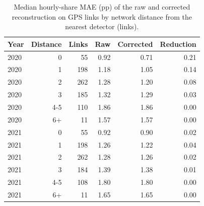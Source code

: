 \begin{table}[htbp]\centering
\caption{Median hourly-share MAE (pp) of the raw and corrected reconstruction on GPS links by network distance from the nearest detector (links).}
\label{tab:distance}
\begin{tabular}{@{}lrrrrr@{}}\toprule
Year & Distance & Links & Raw & Corrected & Reduction \\\midrule
2020 & 0 & 55 & 0.92 & 0.71 & 0.21 \\
2020 & 1 & 198 & 1.18 & 1.05 & 0.14 \\
2020 & 2 & 262 & 1.28 & 1.20 & 0.08 \\
2020 & 3 & 185 & 1.32 & 1.29 & 0.03 \\
2020 & 4-5 & 110 & 1.86 & 1.86 & 0.00 \\
2020 & 6+ & 11 & 1.57 & 1.57 & 0.00 \\
2021 & 0 & 55 & 0.92 & 0.90 & 0.02 \\
2021 & 1 & 198 & 1.26 & 1.22 & 0.04 \\
2021 & 2 & 262 & 1.28 & 1.26 & 0.02 \\
2021 & 3 & 184 & 1.39 & 1.38 & 0.01 \\
2021 & 4-5 & 108 & 1.80 & 1.80 & 0.00 \\
2021 & 6+ & 11 & 1.65 & 1.65 & 0.00 \\
\bottomrule\end{tabular}\end{table}
